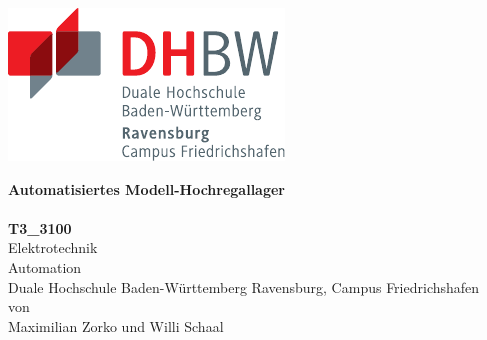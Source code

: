 \documentclass[a4paper,12pt]{scrartcl}
\begin{document}
	\begin{titlepage}
		\enlargethispage{4.0cm}
		\sffamily 								%
		\parbox{0.5\linewidth}{
			\begin{flushleft}
				\includegraphics[width=0.4\linewidth]{images/DHBW_d_R_FN_46mm_4c.pdf}\\[5ex]
			\end{flushleft}
		}
		
		
		\begin{center}
			
			{\fontsize{20.74pt}{24pt}\selectfont
				\textbf{Automatisiertes Modell-Hochregallager}\\[1.5ex]}
			{\fontsize{14pt}{17pt}\selectfont
				\textbf{}\\[5ex]}
			{\fontsize{17pt}{20pt}\selectfont
				\textbf{T3\_3100}\\[2ex]}
			{\fontsize{14pt}{17pt}\selectfont
				Elektrotechnik\\[2ex]}
			{\fontsize{12pt}{14pt}\selectfont
				Automation\\[1ex]
				Duale Hochschule Baden-Württemberg Ravensburg, Campus Friedrichshafen\\[5ex]
				von\\[1ex]
				Maximilian Zorko und Willi Schaal\\[15ex]}
			
			
		\end{center}
		

\end{titlepage}
\end{document}
